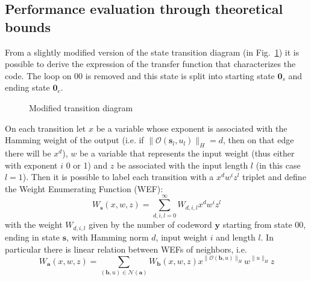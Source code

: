 \documentclass[10pt]{article}
\newcommand{\outf}[1] {\mathcal{O}(#1)}
\newcommand{\s} {\mathbf{s}}
\begin{document}
\subsection{Performance evaluation through theoretical bounds}

From a slightly modified version of the state transition diagram (in Fig.~\ref{fig:state_t}) it is possible to derive the expression of the transfer function that characterizes the code. The loop on $00$ is removed and this state is split into starting state $\mathbf{0}_s$ and ending state $\mathbf{0}_e$.

\begin{figure}
\centering
{}
\caption{Modified transition diagram}
\label{fig:state_t}
\end{figure}

On each transition let $x$ be a variable whose exponent is associated with the Hamming weight of the output (i.e. if $\|\outf{\s_l, u_l}\|_H = d$, then on that edge there will be $x^d$), $w$ be a variable that represents the input weight (thus either with exponent $i$ 0 or 1) and $z$ be associated with the input length $l$ (in this case $l=1$). Then it is possible to label each transition with a $x^dw^iz^l$ triplet and define the Weight Enumerating Function (WEF):
\begin{equation}
	W_{\mathbf{s}}(x, w, z) = \sum_{d, i, l = 0}^{\infty}W_{d, i, l} x^dw^iz^l
\end{equation}
with the weight $W_{d, i, l}$ given by the number of codeword $\mathbf{y}$ starting from state $00$, ending in state $\mathbf{s}$, with Hamming norm $d$, input weight $i$ and length $l$. In particular there is linear relation between WEFs of neighbors, i.e.
\begin{equation}
	W_{\mathbf{a}}(x, w, z) = \sum_{(\mathbf{b}, u) \in \mathcal{N}(\mathbf{a})
	} W_{\mathbf{b}}(x,w,z) x^{\|\outf{\mathbf{b}, u}\|_H} w^{\|u\|_H} z
\end{equation}
\end{document}
